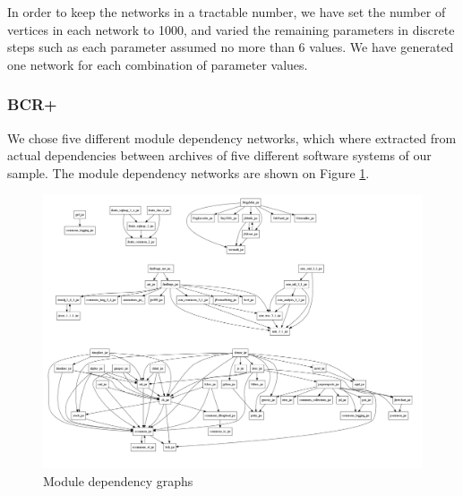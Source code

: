 
In order to keep the networks in a tractable number, we have set the number of
vertices in each network to 1000, and varied the remaining parameters in
discrete steps such as each parameter assumed no more than 6 values. We have
generated one network for each combination of parameter values.


\subsubsection{BCR+}

We chose five different module dependency networks, which where extracted from
actual dependencies between archives of five different software systems of our
sample. The module dependency networks are shown on Figure
\ref{fig:architectures}. 

\begin{figure}[!t]
\centering
\includegraphics[width=1.0\textwidth]{architectures}
\caption{Module dependency graphs}
\label{fig:architectures}
\end{figure}


